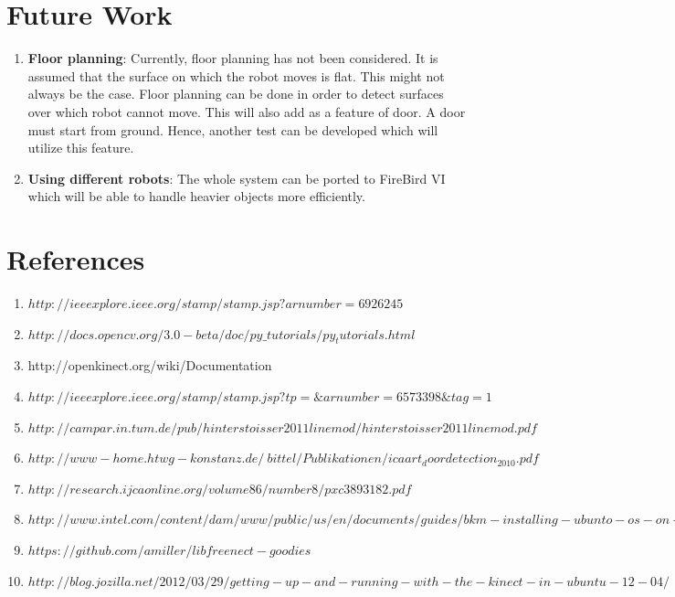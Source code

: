 \documentclass{report}
\begin{document}
\chapter{Future Work}

\begin{enumerate}
 \item \textbf{Floor planning}: Currently, floor planning has not been considered. It is assumed that the surface on which the
 robot moves is flat. This might not always be the case. Floor planning can be done in order to detect surfaces over which robot
 cannot move. This will also add as a feature of door. A door must start from ground. Hence, another test can be developed
 which will utilize this feature.
 
 \item \textbf{Using different robots}: The whole system can be ported to FireBird VI which will be able to handle heavier objects more efficiently.
\end{enumerate}

\chapter{References}
\begin{enumerate}
 \item $http://ieeexplore.ieee.org/stamp/stamp.jsp?arnumber=6926245$
 \item $http://docs.opencv.org/3.0-beta/doc/py\_tutorials/py_tutorials.html$
 \item http://openkinect.org/wiki/Documentation
 \item $http://ieeexplore.ieee.org/stamp/stamp.jsp?tp=\&arnumber=6573398\&tag=1$
 \item $http://campar.in.tum.de/pub/hinterstoisser2011linemod/hinterstoisser2011linemod.pdf$
 \item $http://www-home.htwg-konstanz.de/~bittel/Publikationen/icaart_doordetection_2010.pdf$
 \item $http://research.ijcaonline.org/volume86/number8/pxc3893182.pdf$
 \item $http://www.intel.com/content/dam/www/public/us/en/documents/guides/bkm-installing-ubunto-os-on-de2i-150-board-guide.pdf$
 \item $https://github.com/amiller/libfreenect-goodies$
 \item $http://blog.jozilla.net/2012/03/29/getting-up-and-running-with-the-kinect-in-ubuntu-12-04/$
\end{enumerate}
 
\end{document}
